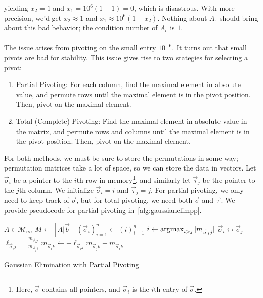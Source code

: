         yielding \(x_2=1\) and \(x_1=10^6(1-1)=0\), which is disastrous. With more precision, we'd get \(x_2\approx 1\) and \(x_1\approx 10^6(1-x_2)\). Nothing about \(A_\epsilon\) should bring about this bad behavior; the condition number of \(A_\epsilon\) is \(1\).
        \\
        \\
        The issue arises from pivoting on the small entry \(10^{-6}\). It turns out that small pivots are bad for stability. This issue gives rise to two stategies for selecting a pivot:
        \begin{enumerate}
            \item Partial Pivoting: For each column, find the maximal element in absolute value, and permute rows until the maximal element is in the pivot position. Then, pivot on the maximal element.
            \item Total (Complete) Pivoting: Find the maximal element in absolute value in the matrix, and permute rows and columns until the maximal element is in the pivot position. Then, pivot on the maximal element.
        \end{enumerate}
        For both methods, we must be sure to store the permutations in some way; permutation matrices take a lot of space, so we can store the data in vectors. Let \(\vec{\sigma}_i\) be a pointer to the \(i\)th row in memory\footnote{Here, \(\vec{\sigma}\) contains all pointers, and \(\vec{\sigma}_i\) is the \(i\)th entry of \(\vec{\sigma}\).}, and similarly let \(\vec{\tau}_j\) be the pointer to the \(j\)th column. We initialize \(\vec{\sigma}_i=i\) and \(\vec{\tau}_j=j\). For partial pivoting, we only need to keep track of \(\vec{\sigma}\), but for total pivoting, we need both \(\vec{\sigma}\) and \(\vec{\tau}\). We provide pseudocode for partial pivoting in~\ref{alg:gaussianelimpp}.
        \begin{algorithm}[H] 
            \begin{algorithmic}[1]
                \Require \(A\in\mathcal{M}_{nn}\) 
                    \State \(M\gets [A|\vec{b}]\)
                    \State \((\vec{\sigma}_i)_{i=1}^n\gets (i)_{i=1}^n\)
                         
                        \State \(i\gets \operatorname{argmax}_{i>j} |m_{\overset{_{\rightharpoonup}}{\sigma}_ij}|\)
                        \State \(\vec{\sigma}_i\leftrightarrow \vec{\sigma}_j\)  
                        \EndIf
                            \State \(\ell_{\vec{\sigma}_ij}=\frac{m_{\vec{\sigma}_ij}}{m_{\vec{\sigma}_jj}}\)
                                \State \(m_{\vec{\sigma}_ik}\gets-\ell_{\vec{\sigma}_ij}m_{\vec{\sigma}_jk}+m_{\vec{\sigma}_ik}\)
                            \EndFor
                        \EndFor
                    \EndFor
                \EndProcedure 
            \end{algorithmic}
            \caption{Gaussian Elimination with Partial Pivoting}
            \label{alg:gaussianelimpp}
        \end{algorithm}
